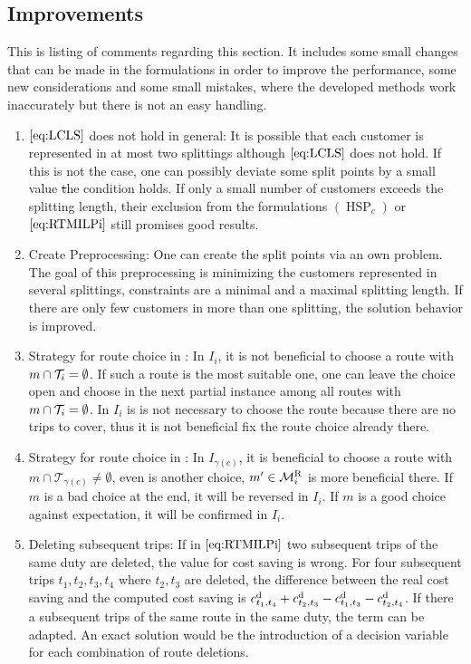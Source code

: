 \subsection{Improvements}

This is listing of comments regarding this section. It includes some small changes that can be made in the formulations in order to improve the performance, some new considerations and some small mistakes, where the developed methods work inaccurately but there is not an easy handling.

\begin{enumerate}
	\item{$\eqref{eq:LCLS}$ does not hold in general}:
It is possible that each customer is represented in at most two splittings although $\eqref{eq:LCLS}$ does not hold. If this is not the case, one can possibly deviate some split points by a small value \st the condition holds. If only a small number of customers exceeds the splitting length, their exclusion from the formulations $(\operatorname{HSP}_c)$ or $\eqref{eq:RTMILPi}$ still promises good results.
	\item{Create Preprocessing}:
One can create the split points via an own problem. The goal of this preprocessing is minimizing the customers represented in several splittings, constraints are a minimal and a maximal splitting length. If there are only few customers in more than one splitting, the solution behavior is improved.
	\item{Strategy for route choice in }:
In $I_i$, it is not beneficial to choose a route with $m\cap\mathcal{T}_i=\emptyset$. If such a route is the most suitable one, one can leave the choice open and choose in the next partial instance among all routes with $m\cap\mathcal{T}_i=\emptyset$. In $I_i$ is is not necessary to choose the route because there are no trips to cover, thus it is not beneficial fix the route choice already there.
	\item{Strategy for route choice in }:
In $I_{\gamma(c)}$, it is beneficial to choose a route with $m\cap\mathcal{T}_{\gamma(c)}\neq\emptyset$, even is another choice, \ie $m'\in\mathcal{M}^{\operatorname{R}}_i$ is more beneficial there. If $m$ is a bad choice at the end, it will be reversed in $I_i$. If $m$ is a good choice against expectation, it will be confirmed in $I_i$.
	\item{Deleting subsequent trips}:
If in $\eqref{eq:RTMILPi}$ two subsequent trips of the same duty are deleted, the value for cost saving is wrong. For four subsequent trips $t_1, t_2, t_3, t_4$ where $t_2, t_3$ are deleted, the difference between the real cost saving and the computed cost saving is ${c^{\operatorname{d}}_{t_1,t_4}+c^{\operatorname{d}}_{t_2,t_3}-c^{\operatorname{d}}_{t_1,t_3}-c^{\operatorname{d}}_{t_2,t_4}}$. If there a subsequent trips of the same route in the same duty, the term can be adapted. An exact solution would be the introduction of a decision variable for each combination of route deletions.
\end{enumerate}